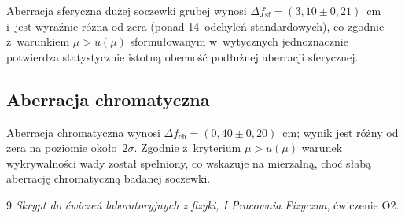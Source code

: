 \documentclass[12pt, a4paper]{article}
\begin{document}
Aberracja sferyczna dużej soczewki grubej wynosi
$\Delta f_{\mathrm{sf}} = (3{,}10\pm0{,}21)$~cm i~jest wyraźnie różna od zera
(ponad 14~odchyleń standardowych), co zgodnie z~warunkiem $\mu > u(\mu)$ sformułowanym w~wytycznych jednoznacznie potwierdza statystycznie istotną obecność podłużnej aberracji sferycznej.

\subsection{Aberracja chromatyczna}

Aberracja chromatyczna wynosi $\Delta f_{\mathrm{ch}} = (0{,}40\pm0{,}20)$~cm;
wynik jest różny od zera na poziomie około~$2\sigma$. Zgodnie z~kryterium $\mu > u(\mu)$ warunek wykrywalności wady został spełniony, co wskazuje na mierzalną, choć słabą aberrację chromatyczną badanej soczewki.

\begin{thebibliography}{9}
\textit{Skrypt do ćwiczeń laboratoryjnych z fizyki, I Pracownia Fizyczna}, ćwiczenie O2.
\end{thebibliography}
\end{document}
